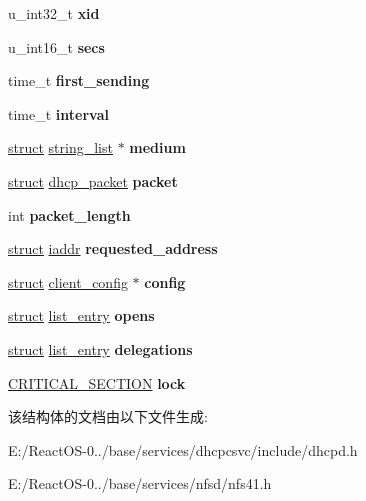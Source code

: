 \begin{DoxyCompactItemize}
\mbox{\label{structclient__state_aec99e9b9a70c44a9c4f11fb87e5c49eb}} 
u\+\_\+int32\+\_\+t {\bfseries xid}
\item 
\mbox{\label{structclient__state_ab2d361ef058efeb36dd3cbe3ceeab51e}} 
u\+\_\+int16\+\_\+t {\bfseries secs}
\item 
\mbox{\label{structclient__state_a8705839514c66263698e94dab7ed2e9a}} 
time\+\_\+t {\bfseries first\+\_\+sending}
\item 
\mbox{\label{structclient__state_aab61f1d88732efa8bcf6542b9875c1b9}} 
time\+\_\+t {\bfseries interval}
\item 
\mbox{\label{structclient__state_ae893b148a5e7e14959931ee1215e22f6}} 
\hyperlink{interfacestruct}{struct} \hyperlink{structstring__list}{string\+\_\+list} $\ast$ {\bfseries medium}
\item 
\mbox{\label{structclient__state_a458fb3a000b99d99cf5d57a044b81c0e}} 
\hyperlink{interfacestruct}{struct} \hyperlink{structdhcp__packet}{dhcp\+\_\+packet} {\bfseries packet}
\item 
\mbox{\label{structclient__state_aed8e4c956bc63567a68988dc5380db64}} 
int {\bfseries packet\+\_\+length}
\item 
\mbox{\label{structclient__state_a784dd0e9cfe7c381758ceb46aa04faac}} 
\hyperlink{interfacestruct}{struct} \hyperlink{structiaddr}{iaddr} {\bfseries requested\+\_\+address}
\item 
\mbox{\label{structclient__state_a488368b92be432d28b40bd09896c9c6c}} 
\hyperlink{interfacestruct}{struct} \hyperlink{structclient__config}{client\+\_\+config} $\ast$ {\bfseries config}
\item 
\mbox{\label{structclient__state_aa348cee5251d622776f686cc6cf6d4c0}} 
\hyperlink{interfacestruct}{struct} \hyperlink{structlist__entry}{list\+\_\+entry} {\bfseries opens}
\item 
\mbox{\label{structclient__state_ad8b637e67aa5edb71f20cbefe6c61108}} 
\hyperlink{interfacestruct}{struct} \hyperlink{structlist__entry}{list\+\_\+entry} {\bfseries delegations}
\item 
\mbox{\label{structclient__state_a4a10e34446c6ab34a9e6cc16e523bab7}} 
\hyperlink{struct___c_r_i_t_i_c_a_l___s_e_c_t_i_o_n}{C\+R\+I\+T\+I\+C\+A\+L\+\_\+\+S\+E\+C\+T\+I\+ON} {\bfseries lock}
\end{DoxyCompactItemize}


该结构体的文档由以下文件生成\+:\begin{DoxyCompactItemize}
\item 
E\+:/\+React\+O\+S-\/0../base/services/dhcpcsvc/include/dhcpd.\+h\item 
E\+:/\+React\+O\+S-\/0../base/services/nfsd/nfs41.\+h\end{DoxyCompactItemize}

